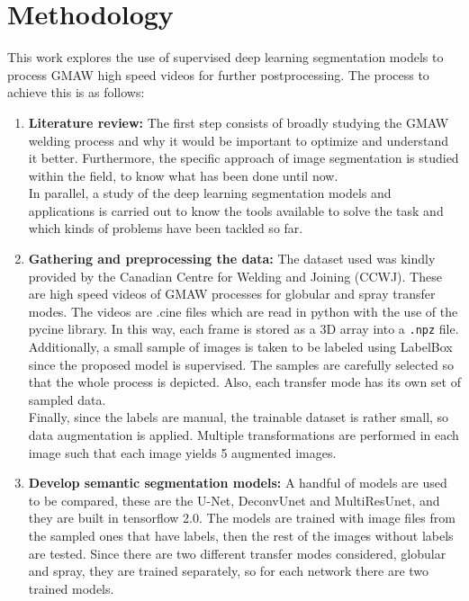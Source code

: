\chapter{Methodology}

This work explores the use of supervised deep learning segmentation models to process GMAW high speed videos for further postprocessing. The process to achieve this is as follows:

\begin{enumerate}
    \item \textbf{Literature review:} The first step consists of broadly studying the GMAW welding process and why it would be important to optimize and understand it better. Furthermore, the specific approach of image segmentation is studied within the field, to know what has been done until now.\\ 
    
    In parallel, a study of the deep learning segmentation models and applications is carried out to know the tools available to solve the task and which kinds of problems have been tackled so far.\\
    
    \item \textbf{Gathering and preprocessing the data:}
    The dataset used was kindly provided by the Canadian Centre for Welding and Joining (CCWJ). These are high speed videos of GMAW processes for globular and spray transfer modes. The videos are .cine files which are read in python with the use of the pycine library. In this way, each frame is stored as a 3D array into a \texttt{.npz} file.\\
    
    Additionally, a small sample of images is taken to be labeled using LabelBox since the proposed model is supervised. The samples are carefully selected so that the whole process is depicted. Also, each transfer mode has its own set of sampled data.\\
    
    Finally, since the labels are manual, the trainable dataset is rather small, so data augmentation is applied. Multiple transformations are performed in each image such that each image yields 5 augmented images.\\
    
    \item \textbf{Develop semantic segmentation models:}
    A handful of models are used to be compared, these are the U-Net, DeconvUnet and MultiResUnet, and they are built in tensorflow 2.0. The models are trained with image files from the sampled ones that have labels, then the rest of the images without labels are tested. Since there are two different transfer modes considered, globular and spray, they are trained separately, so for each network there are two trained models.\\
    

\end{enumerate}
